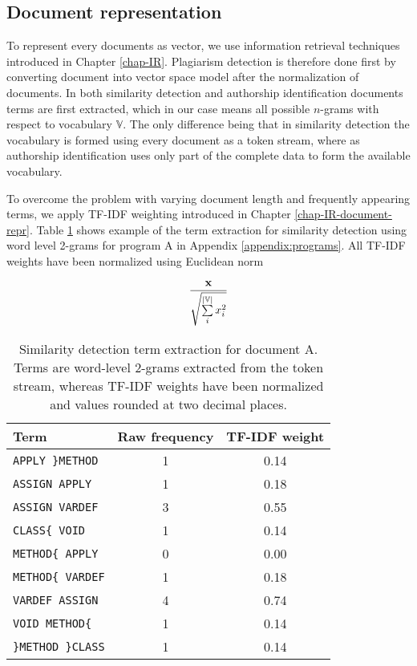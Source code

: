 \subsection{Document representation}

To represent every documents as vector, we use information retrieval techniques introduced in Chapter \ref{chap-IR}. Plagiarism detection is therefore done first by converting document into vector space model after the normalization of documents. In both similarity detection and authorship identification documents terms are first extracted, which in our case means all possible $n$-grams with respect to vocabulary $\mathbb{V}$. The only difference being that in similarity detection the vocabulary is formed using every document as a token stream, where as authorship identification uses only part of the complete data to form the available vocabulary. 

To overcome the problem with varying document length and frequently appearing terms, we apply TF-IDF weighting introduced in Chapter \ref{chap-IR-document-repr}. Table \ref{tbl-ngram-sd} shows example of the term extraction for similarity detection using word level 2-grams for program A in Appendix \ref{appendix:programs}. All TF-IDF weights have been normalized using Euclidean norm 

\begin{equation}
    \dfrac{\mathbf{x}}
          {\sqrt{\sum \limits_i^{|\mathbb{V}|} x_i^2}}
\end{equation}


\begin{table}[ht]
\centering
\caption{Similarity detection term extraction for document A. Terms are word-level 2-grams extracted from the token stream, whereas TF-IDF weights have been normalized and values rounded at two decimal places.}
\label{tbl-ngram-sd}
\begin{tabular}{l|c|c}
\bf Term & \bf Raw frequency & \bf TF-IDF weight \\ \hline
    \texttt{APPLY \}METHOD} & 1 & 0.14\\
    \texttt{ASSIGN APPLY} & 1 & 0.18\\
    \texttt{ASSIGN VARDEF} & 3 & 0.55\\
    \texttt{CLASS\{ VOID} & 1 & 0.14\\
    \texttt{METHOD\{ APPLY} & 0 & 0.00\\
    \texttt{METHOD\{ VARDEF} & 1 & 0.18\\
    \texttt{VARDEF ASSIGN} & 4 & 0.74\\
    \texttt{VOID METHOD\{} & 1 & 0.14\\
    \texttt{\}METHOD \}CLASS} & 1 & 0.14\\
\end{tabular}
\end{table}

